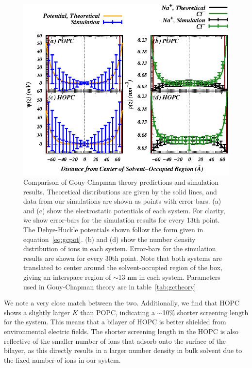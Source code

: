 \documentclass[12pt,openany,final]{book}
\newcommand{\about}{$\sim$}
\begin{document}
\begin{figure}[p]
    \caption[Comparison of Gouy-Chapman theory predictions and simulation results.]{ 
Comparison of Gouy-Chapman theory predictions and simulation results. Theoretical distributions are given by the 
solid lines, and data from our simulations are shown as points with error bars. (a) and (c) show the electrostatic
potentials of each system. For clarity, we show error-bars for the simulation
results for every 13th point. The Debye-Huckle 
potentials shown follow the form given in equation~\ref{eq:gcpot}. (b) and (d) show the number density distribution
of ions in each system. Error-bars for the 
simulation results are shown
for every 30th point. Note that both systems are
translated to center around the solvent-occupied region of the box, giving an interspace region of \about 13 nm in
each system. Parameters used in Gouy-Chapman theory are in table~\ref{tab:gctheory} }
\label{fig:gctheory}
\includegraphics[width=\textwidth]{gouy.eps}
\end{figure}
We note a very close match between the two. Additionally, we find that HOPC shows a slightly 
larger $K$ than POPC, indicating a \about10\% 
shorter screening length for the system. This means that a bilayer of HOPC is better shielded from environmental electric fields.
The shorter screening length in the HOPC is also reflective of the smaller 
number of ions that adsorb onto the surface of the bilayer, as this directly results in a larger number density in bulk solvent due to the fixed number of ions in our system.
\end{document}
